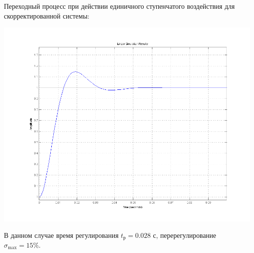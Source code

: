 \documentclass[a4paper,12pt]{article}
\renewcommand{\^}[2]{#1^{\, #2} \kern -1pt}
\newcommand{\1}{\kern 1pt}
\newcommand{\0}{\kern -1pt}
\begin{document}
	\newpage

	Переходный процесс при действии единичного ступенчатого воздействия для скорректированной системы:

	\includegraphics[scale=0.6,page=1]{6_зад/скачок_подобранная_2}

	В данном случае время регулирования $t_{\text{р}} = 0.028$ с, перерегулирование $\sigma_{\max} = 15 \%$.

	
	
\end{document}
